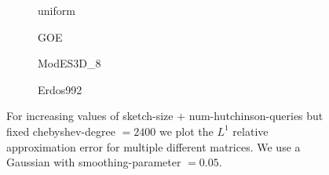 \begin{figure}[ht]
    \centering
    \begin{subfigure}[b]{0.49\columnwidth}
        
        \caption{uniform}
        \label{fig:5-experiments-multi-matrix-convergence-uniform}
    \end{subfigure}
    \begin{subfigure}[b]{0.49\columnwidth}
        
        \caption{GOE}
        \label{fig:5-experiments-multi-matrix-convergence-goe}
    \end{subfigure}
    \begin{subfigure}[b]{0.49\columnwidth}
        
        \caption{ModES3D\_8}
        \label{fig:5-experiments-multi-matrix-convergence-ModES3D}
    \end{subfigure}
    \begin{subfigure}[b]{0.49\columnwidth}
        
        \caption{Erdos992}
        \label{fig:5-experiments-multi-matrix-convergence-Erdos}
    \end{subfigure}
    \caption{For increasing values of \gls{sketch-size} $+$ \gls{num-hutchinson-queries}
    but fixed \gls{chebyshev-degree} $=2400$ we plot the $L^1$ relative approximation error 
    for multiple different matrices. We use a
    Gaussian  with \gls{smoothing-parameter} $=0.05$.}
    \label{fig:5-experiments-multi-matrix-convergence}
\end{figure}
